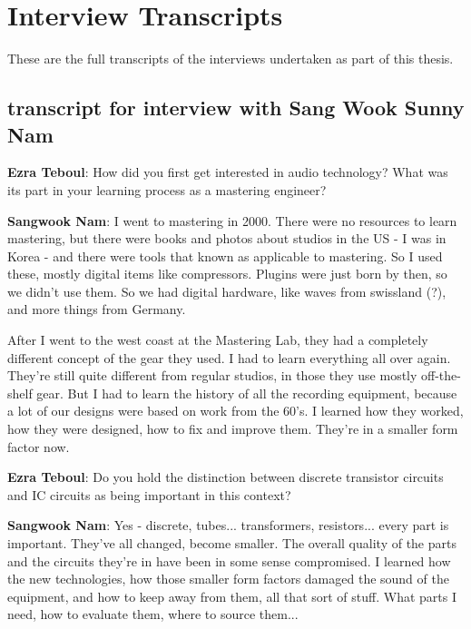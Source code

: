 
\chapter{Interview Transcripts}\label{app:inttrans} %


These are the full transcripts of the interviews undertaken as part of this thesis.

\section{transcript for interview with Sang Wook Sunny Nam}

\textbf{Ezra Teboul}: How did you first get interested in audio technology? What was its part in your learning process as a mastering engineer?

\textbf{Sangwook Nam}: I went to mastering in 2000. There were no resources to learn mastering, but there were books and photos about studios in the US - I was in Korea - and there were tools that known as applicable to mastering. So I used these, mostly digital items like compressors. Plugins were just born by then, so we didn't use them. So we had digital hardware, like waves from swissland (?), and more things from Germany.

After I went to the west coast at the Mastering Lab, they had a completely different concept of the gear they used. I had to learn everything all over again. They're still quite different from regular studios, in those they use mostly off-the-shelf gear. But I had to learn the history of all the recording equipment, because a lot of our designs were based on work from the 60's. I learned how they worked, how they were designed, how to fix and improve them. They're in a smaller form factor now.

\textbf{Ezra Teboul}: Do you hold the distinction between discrete transistor circuits and IC circuits as being important in this context?

\textbf{Sangwook Nam}: Yes - discrete, tubes... transformers, resistors... every part is important. They've all changed, become smaller. The overall quality of the parts and the circuits they're in have been in some sense compromised. I learned how the new technologies, how those smaller form factors damaged the sound of the equipment, and how to keep away from them, all that sort of stuff. What parts I need, how to evaluate them, where to source them...

